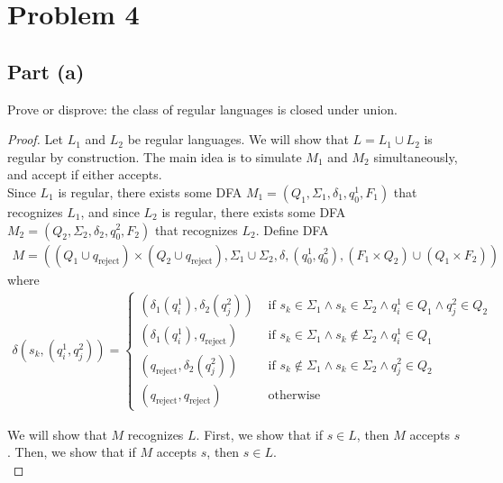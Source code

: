 \documentclass{article}
\begin{document}
\section*{Problem 4}

\subsection*{Part (a)}

Prove or disprove: the class of regular languages is closed under union.

\begin{proof}
    Let $L_1$ and $L_2$ be regular languages. We will show that $L = L_1 \cup L_2$ is regular by construction. The main idea is to simulate $M_1$ and $M_2$ 
    simultaneously, and accept if either accepts. \\
    
    \noindent
    Since $L_1$ is regular, there exists some DFA $M_1 = (Q_1, \Sigma_1, \delta_1, q_{0}^1, F_1)$ that recognizes $L_1$, and since $L_2$ is regular, there 
    exists some DFA $M_2 = (Q_2, \Sigma_2, \delta_2, q_{0}^2, F_2)$ that recognizes $L_2$. Define DFA 
    \begin{align*}
        M = ((Q_1 \cup q_{\text{reject}}) \times (Q_2 \cup q_{\text{reject}}), \Sigma_1 \cup \Sigma_2, \delta, (q_{0}^1, q_{0}^2), (F_1 \times Q_2) \cup (Q_1 \times F_2))
    \end{align*}
    where
    \begin{align*}
        \delta(s_k, (q_i^1, q_j^2)) = \begin{cases}
            (\delta_1(q_i^1), \delta_2(q_j^2)) & \text{ if } s_k \in \Sigma_1 \land s_k \in \Sigma_2 \land q_i^1 \in Q_1 \land q_j^2 \in Q_2 \\
            (\delta_1(q_i^1), q_{\text{reject}}) & \text{ if } s_k \in \Sigma_1 \land s_k \not \in \Sigma_2 \land q_i^1 \in Q_1 \\
            (q_{\text{reject}}, \delta_2(q_j^2)) & \text{ if } s_k \not \in \Sigma_1 \land s_k \in \Sigma_2 \land q_j^2 \in Q_2 \\
            (q_{\text{reject}}, q_{\text{reject}}) & \text{ otherwise}
        \end{cases}
    \end{align*}

    \noindent
    We will show that $M$ recognizes $L$. First, we show that if $s \in L$, then $M$ accepts $s$. Then, we show that if $M$ accepts $s$, then $s \in L$. \\ 
    

\end{proof}
\end{document}
